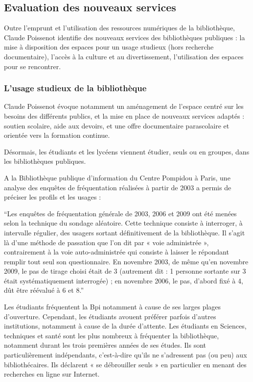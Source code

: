 \documentclass[french,a4paper,12pt]{article}
\begin{document}
\subsection{Evaluation des nouveaux services}

\quad Outre l’emprunt et l’utilisation des ressources numériques de la bibliothèque, Claude Poissenot\citep{lanouvellebibliotheque2009} identifie des nouveaux services des bibliothèques publiques : la mise à disposition des espaces pour un usage studieux (hors recherche documentaire), l’accès à la culture et au divertissement, l’utilisation des espaces pour se rencontrer. 

\subsubsection{L’usage studieux de la bibliothèque }

\quad Claude Poissenot évoque notamment un aménagement de l’espace centré sur les besoins des différents publics, et la mise en place de nouveaux services adaptés :  soutien scolaire, aide aux devoirs, et une offre documentaire parascolaire et orientée vers la formation continue. 

Désormais, les étudiants et les lycéens viennent étudier, seuls ou en groupes, dans les bibliothèques publiques.  

\quad A la Bibliothèque publique d’information du Centre Pompidou à Paris\citep{etudiants2014}, une analyse des enquêtes de fréquentation réalisées à partir de 2003 a permis de préciser les profils et les usages : 

“Les enquêtes de fréquentation générale de 2003, 2006 et 2009 ont été menées selon la technique du sondage aléatoire. Cette technique consiste à interroger, à intervalle régulier, des usagers sortant définitivement de la bibliothèque. Il s’agit là d’une méthode de passation que l’on dit par « voie administrée », contrairement à la voie auto-administrée qui consiste à laisser le répondant remplir tout seul son questionnaire. En novembre 2003, de même qu’en novembre 2009, le pas de tirage choisi était de 3 (autrement dit : 1 personne sortante sur 3 était systématiquement interrogée) ; en novembre 2006, le pas, d’abord fixé à 4, dût être réévalué à 6 et 8.” 

Les étudiants fréquentent la Bpi notamment à cause de ses larges plages d’ouverture. Cependant, les étudiants avouent préférer parfois d’autres institutions, notamment à cause de la durée d’attente. Les étudiants en Sciences, techniques et santé sont les plus nombreux à fréquenter la bibliothèque, notamment durant les trois premières années de ses études. Ils sont particulièrement indépendants, c’est-à-dire qu’ils ne s’adressent pas (ou peu) aux bibliothécaires. Ils déclarent « se débrouiller seuls » en particulier en menant des recherches en ligne sur Internet. 
\end{document}
